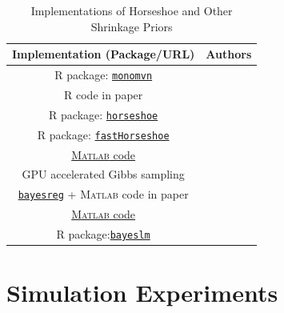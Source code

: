 \documentclass[sts,preprint]{imsart}
\begin{document}
\begin{table}[htbp]
  \centering
  \caption{Implementations of Horseshoe and Other Shrinkage Priors}
  \footnotesize{
    \begin{tabular}{|c|c|}
    \hline
    Implementation (Package/URL) & Authors \bigstrut\\
    \hline
    \textsc{R} package: \href{https://cran.r-project.org/web/packages/monomvn/index.html}{\texttt{monomvn}} & \citet{gramacy2010shrinkage} \bigstrut[t]\\
     \textsc{R} code in paper & \citet{scott_parameter_2010} \\
    \textsc{R} package: \href{https://cran.r-project.org/web/packages/horseshoe/index.html}{\texttt{horseshoe}} & \citet{pas_horseshoe:_2016} \\
    \textsc{R} package: \href{https://cran.r-project.org/web/packages/fastHorseshoe/index.html}{\texttt{fastHorseshoe}} & \citet{hahn_elliptical_2016} \\
    \href{https://github.com/antik015/Fast-Sampling-of-Gaussian-Posteriors}{\textsc{Matlab} code} & \citet{bhattacharya_fast_2015} \\
    GPU accelerated Gibbs sampling & \citet{terenin_gpu-accelerated_2016} \\
    \href{https://cran.r-project.org/web/packages/bayesreg/index.html}{\texttt{bayesreg}} + \textsc{Matlab} code in paper & \citet{makalic2016high} \\
     \href{https://github.com/jamesjohndrow/horseshoe_jo}{\textsc{Matlab} code} & \citet{james2017scalable} \bigstrut[b]\\ 
		R package:\href{https://cran.r-project.org/web/packages/bayeslm/index.html}{\texttt{bayeslm}} & \citet{hahn2017efficient} \\
    \hline
    \end{tabular}%
    }
  \label{tab:hs-imp}%
\end{table}%



\section{Simulation Experiments}\label{sec:simulation}
\end{document}
